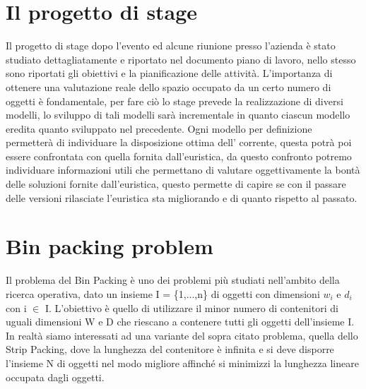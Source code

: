 \section{Il progetto di stage}
Il progetto di stage dopo l'evento  ed alcune riunione presso l'azienda è stato studiato dettagliatamente e riportato nel documento piano di lavoro, nello stesso sono riportati gli obiettivi e la pianificazione delle attività.
L'importanza di ottenere una valutazione reale dello spazio occupato da un certo numero di oggetti è fondamentale, per fare ciò lo stage prevede la realizzazione di diversi modelli, lo sviluppo di tali modelli sarà incrementale in quanto ciascun modello eredita quanto sviluppato nel precedente. Ogni modello per definizione permetterà di individuare la disposizione ottima dell' corrente, questa potrà poi essere confrontata con quella fornita dall'euristica, da questo confronto potremo individuare informazioni utili che permettano di valutare oggettivamente la bontà delle soluzioni fornite dall'euristica, questo permette di capire se con il passare delle versioni rilasciate l'euristica sta migliorando e di quanto rispetto al passato.

\section{Bin packing problem}
Il problema del Bin Packing è uno dei problemi più studiati nell'ambito della ricerca operativa, dato un insieme I = \{1,...,n\} di oggetti con dimensioni $w_{i}$ e $d_{i}$ con i $\in$ I.
L'obiettivo è quello di utilizzare il minor numero di contenitori di uguali dimensioni W e D che riescano a contenere tutti gli oggetti dell'insieme I.
\newline
In realtà siamo interessati ad una variante del sopra citato problema, quella dello Strip Packing, dove la lunghezza del contenitore è infinita e si deve disporre l'insieme N di oggetti nel modo migliore affinché si minimizzi la lunghezza lineare occupata dagli oggetti.
